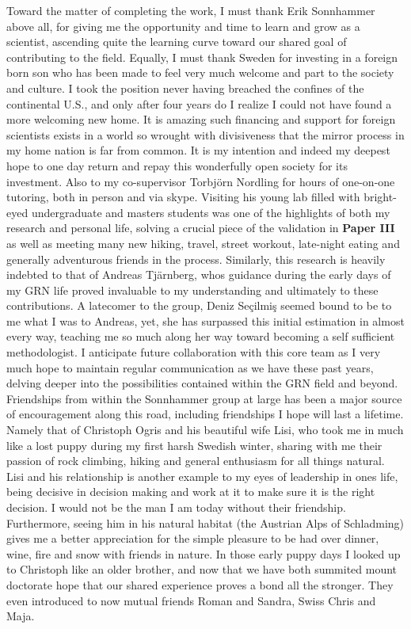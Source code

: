 Toward the matter of completing the work, I must thank Erik Sonnhammer above all, for giving me the opportunity and time to learn and grow as a scientist, ascending quite the learning curve toward our shared goal of contributing to the field. Equally, I must thank Sweden for investing in a foreign born son who has been made to feel very much welcome and part to the society and culture. I took the position never having breached the confines of the continental U.S., and only after four years do I realize I could not have found a more welcoming new home. It is amazing such financing and support for foreign scientists exists in a world so wrought with divisiveness that the mirror process in my home nation is far from common. It is my intention and indeed my deepest hope to one day return and repay this wonderfully open society for its investment. Also to my co-supervisor Torbj{\"o}rn Nordling for hours of one-on-one tutoring, both in person and via skype. Visiting his young lab filled with bright-eyed undergraduate and masters students was one of the highlights of both my research and personal life, solving a crucial piece of the validation in \textbf{Paper III} as well as meeting many new hiking, travel, street workout, late-night eating and generally adventurous friends in the process. Similarly, this research is heavily indebted to that of Andreas Tj{\"a}rnberg, whos guidance during the early days of my GRN life proved invaluable to my understanding and ultimately to these contributions. A latecomer to the group, Deniz Seçilmiş seemed bound to be to me what I was to Andreas, yet, she has surpassed this initial estimation in almost every way, teaching me so much along her way toward becoming a self sufficient methodologist. I anticipate future collaboration with this core team as I very much hope to maintain regular communication as we have these past years, delving deeper into the possibilities contained within the GRN field and beyond.
Friendships from within the Sonnhammer group at large has been a major source of encouragement along this road, including friendships I hope will last a lifetime. Namely that of Christoph Ogris and his beautiful wife Lisi, who took me in much like a lost puppy during my first harsh Swedish winter, sharing with me their passion of rock climbing, hiking and general enthusiasm for all things natural. Lisi and his relationship is another example to my eyes of leadership in ones life, being decisive in decision making and work at it to make sure it is the right decision. I would not be the man I am today without their friendship. Furthermore, seeing him in his natural habitat (the Austrian Alps of Schladming) gives me a better appreciation for the simple pleasure to be had over dinner, wine, fire and snow with friends in nature. In those early puppy days I looked up to Christoph like an older brother, and now that we have both summited mount doctorate hope that our shared experience proves a bond all the stronger. They even introduced to now mutual friends Roman and Sandra, Swiss Chris and Maja.

